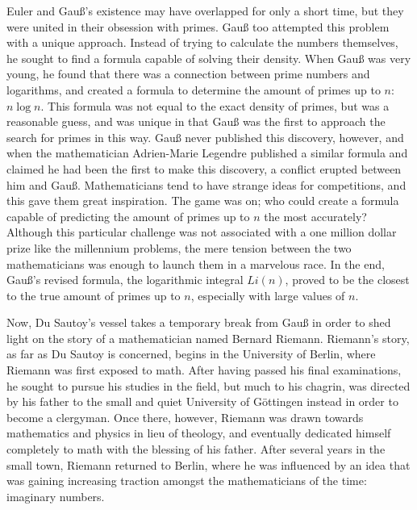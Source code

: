 \documentclass{mathbook}
\begin{document}
    Euler and Gauß's existence may have overlapped for only a short time, but they were united in their obsession with primes. Gauß too attempted this problem with a unique approach. Instead of trying to calculate the numbers themselves, he sought to find a formula capable of solving their density. When Gauß was very young, he found that there was a connection between prime numbers and logarithms, and created a formula to determine the amount of primes up to \(n\): \(n\log n\). This formula was not equal to the exact density of primes, but was a reasonable guess, and was unique in that Gauß was the first to approach the search for primes in this way. Gauß never published this discovery, however, and when the mathematician Adrien-Marie Legendre published a similar formula and claimed he had been the first to make this discovery, a conflict erupted between him and Gauß. Mathematicians tend to have strange ideas for competitions, and this gave them great inspiration. The game was on; who could create a formula capable of predicting the amount of primes up to \(n\) the most accurately? Although this particular challenge was not associated with a one million dollar prize like the millennium problems, the mere tension between the two mathematicians was enough to launch them in a marvelous race. In the end, Gauß's revised formula, the logarithmic integral \(Li(n)\), proved to be the closest to the true amount of primes up to \(n\), especially with large values of \(n\). \par
    
    Now, Du Sautoy's vessel takes a temporary break from Gauß in order to shed light on the story of a mathematician named Bernard Riemann. Riemann's story, as far as Du Sautoy is concerned, begins in the University of Berlin, where Riemann was first exposed to math. After having passed his final examinations, he sought to pursue his studies in the field, but much to his chagrin, was directed by his father to the small and quiet University of Göttingen instead in order to become a clergyman. \cite[p.~65]{Sautoy2003} Once there, however, Riemann was drawn towards mathematics and physics in lieu of theology, and eventually dedicated himself completely to math with the blessing of his father. After several years in the small town, Riemann returned to Berlin, where he was influenced by an idea that was gaining increasing traction amongst the mathematicians of the time: imaginary numbers. \par
\end{document}
